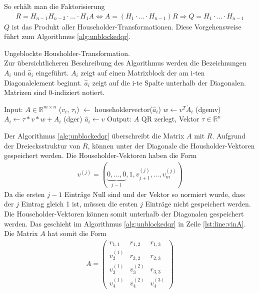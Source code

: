 So erhält man die Faktorisierung
\begin{align*}
R = H_{n-1} H_{n-2}\cdot ...\cdot H_1 A \Leftrightarrow A = (H_1\cdot ...\cdot H_{n-1})R \Rightarrow Q = H_1\cdot ... \cdot H_{n-1}
\end{align*}
$Q$ ist das Produkt aller Householder-Transformationen.
Diese Vorgehensweise führt zum Algorithmus \ref{alg:unblockedqr}. 
\begin{algorithm}[H]
	\caption{Ungeblockte Housholder-Transformation. \\
		Zur übersichtlicheren Beschreibung des Algorithmus werden die Bezeichnungen $A_i$ und $\hat{a}_i$ eingeführt.	$A_i$ zeigt auf einen Matrixblock der am i-ten Diagonalelement beginnt. $\hat{a}_i$ zeigt auf die i-te Spalte unterhalb der Diagonalen. Matrizen sind 0-indiziert notiert.}
	\begin{algorithmic}[1]
	\State Input: $A \in \mathbb{R}^{m \times n}$
		\State ($v_i$, $\tau_i$) $\leftarrow$ householdervector($\hat{a}_i$)
		\State $w \leftarrow v^T\dot A_i$ (dgemv)
		\State $ A_i \leftarrow \tau * v * w + A_i $ (dger)
			\State $\hat{a}_i \leftarrow v$ \label{lst:line:vinA}
		\EndIf
	\EndFor	
	\State Output: $A$ QR zerlegt, Vektor $\tau \in \mathbb{R}^n$
\end{algorithmic} 
\label{alg:unblockedqr}
\end{algorithm}

Der Algorithmus \ref{alg:unblockedqr} überschreibt die Matrix $A$ mit $R$.
Aufgrund der Dreiecksstruktur von $R$,
können unter der Diagonale die Housholder-Vektoren gespeichert werden. 
Die Householder-Vektoren haben die Form 
\begin{align*}
v^{(j)} = ( \underbrace{0,...,0}_{j-1},1,	v_{j+1}^{(j)},...,v_{m}^{(j)}  )
\end{align*}
Da die ersten $j-1$ Einträge Null sind und der Vektor so normiert wurde, dass der $j$ Eintrag gleich 1 ist, müssen die ersten $j$ Einträge nicht gespeichert werden.
Die Householder-Vektoren können somit unterhalb der Diagonalen gespeichert werden. Das geschieht im Algorithmus \ref{alg:unblockedqr} in Zeile \ref{lst:line:vinA}.
Die Matrix $A$ hat somit die Form
\begin{align*}
	A = 
	\left(\begin{array}{ccc}
	r_{1,1}   &  r_{1,2}  & r_{1,3} \\ 
	v_2^{(1)} &  r_{2,2}  & r_{2,3} \\ 
	v_3^{(1)} & v_3^{(2)} & r_{3,3} \\ 
	v_4^{(1)} & v_4^{(2)} & v_4^{(3)}
	\end{array} \right) 
\end{align*}

